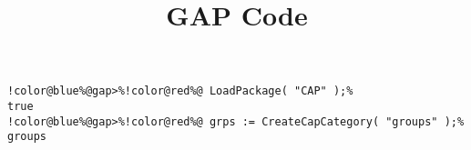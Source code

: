 \documentclass[12pt]{amsart}
\title{GAP Code}
\author{}
\begin{document}
\maketitle

\begin{Verbatim}[commandchars=!@\%,frame=single]
!color@blue%@gap>%!color@red%@ LoadPackage( "CAP" );%
true
!color@blue%@gap>%!color@red%@ grps := CreateCapCategory( "groups" );%
groups
\end{Verbatim}
\end{document}
